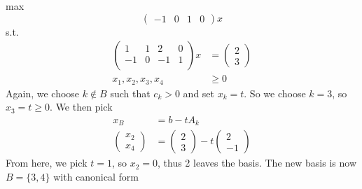 \begin{definition}
        max $$\begin{pmatrix}
                -1 & 0 & 1 & 0
            \end{pmatrix}x$$
        s.t.
        \begin{align*}
            \begin{pmatrix}
                1  & 1 & 2  & 0 \\
                -1 & 0 & -1 & 1 \\
            \end{pmatrix} x & = \begin{pmatrix}
                                    2 \\ 3
                                \end{pmatrix} \\
            x_1,x_2,x_3,x_4    & \geq 0
        \end{align*}
        Again, we choose $k \not \in B$ such that $c_k > 0$ and set $x_k = t$. So we choose $k = 3$, so $x_3 = t \geq 0$. We then pick
        \begin{align*}
            x_B             & = b - tA_k                       \\
            \begin{pmatrix}
                x_2 \\ x_4
            \end{pmatrix} & = \begin{pmatrix}
                                  2 \\ 3
                              \end{pmatrix} - t \begin{pmatrix}
                                                    2 \\ -1
                                                \end{pmatrix}
        \end{align*}
        From here, we pick $t = 1$, so $x_2 = 0$, thus 2 leaves the basis. The new basis is now $B = \{3,4\}$ with canonical form
    

\end{definition}
